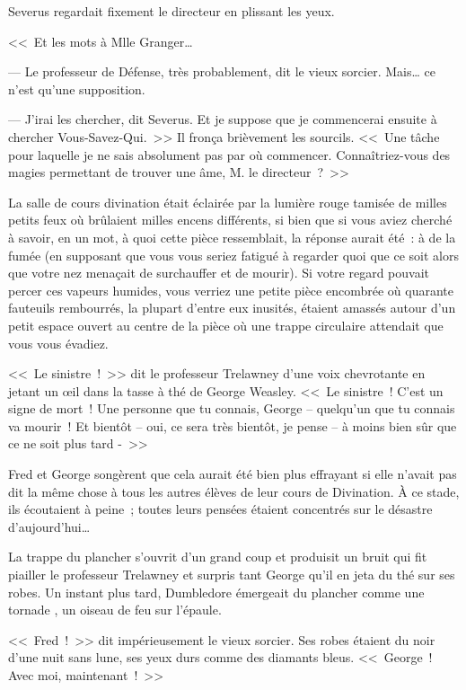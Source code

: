 Severus regardait fixement le directeur en plissant les yeux.

<<~Et les mots à Mlle Granger…

--- Le professeur de Défense, très probablement, dit le vieux sorcier. Mais… ce n'est qu'une supposition.

--- J'irai les chercher, dit Severus. Et je suppose que je commencerai ensuite à chercher Vous-Savez-Qui.~>> Il fronça brièvement les sourcils. <<~Une tâche pour laquelle je ne sais absolument pas par où commencer. Connaîtriez-vous des magies permettant de trouver une âme, M. le directeur~?~>>

\later

La salle de cours divination était éclairée par la lumière rouge tamisée de milles petits feux où brûlaient milles encens différents, si bien que si vous aviez cherché à savoir, en un mot, à quoi cette pièce ressemblait, la réponse aurait été~: à de la fumée (en supposant que vous vous seriez fatigué à regarder quoi que ce soit alors que votre nez menaçait de surchauffer et de mourir). Si votre regard pouvait percer ces vapeurs humides, vous verriez une petite pièce encombrée où quarante fauteuils rembourrés, la plupart d'entre eux inusités, étaient amassés autour d'un petit espace ouvert au centre de la pièce où une trappe circulaire attendait que vous vous évadiez.

<<~Le sinistre~!~>> dit le professeur Trelawney d'une voix chevrotante en jetant un œil dans la tasse à thé de George Weasley. <<~Le sinistre~! C'est un signe de mort~! Une personne que tu connais, George -- quelqu'un que tu connais va mourir~! Et bientôt -- oui, ce sera très bientôt, je pense -- à moins bien sûr que ce ne soit plus tard -~>>

Fred et George songèrent que cela aurait été bien plus effrayant si elle n'avait pas dit la même chose à tous les autres élèves de leur cours de Divination. À ce stade, ils écoutaient à peine~; toutes leurs pensées étaient concentrés sur le désastre d'aujourd'hui…

La trappe du plancher s'ouvrit d'un grand coup et produisit un bruit qui fit piailler le professeur Trelawney et surpris tant George qu'il en jeta du thé sur ses robes. Un instant plus tard, Dumbledore émergeait du plancher comme une tornade , un oiseau de feu sur l'épaule.

<<~Fred~!~>> dit impérieusement le vieux sorcier. Ses robes étaient du noir d'une nuit sans lune, ses yeux durs comme des diamants bleus. <<~George~! Avec moi, maintenant~!~>>

